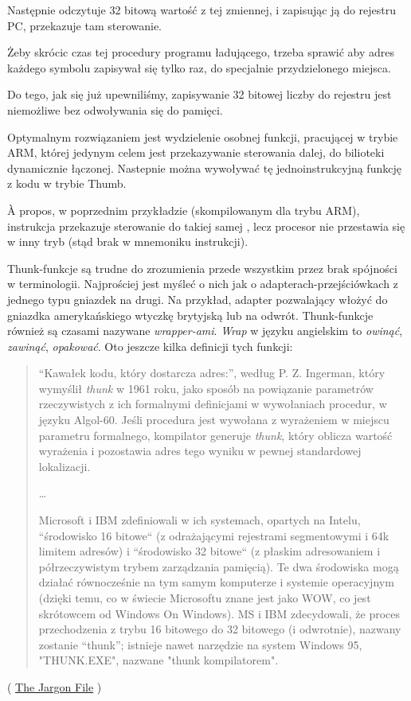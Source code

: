 Następnie  odczytuje 32 bitową wartość z tej zmiennej, i zapisując ją do rejestru \ac{PC}, przekazuje tam sterowanie.

Żeby skrócic czas tej procedury programu ładującego, trzeba sprawić aby adres każdego symbolu zapisywał się tylko raz, do specjalnie przydzielonego miejsca.

Do tego, jak się już upewniliśmy, zapisywanie 32 bitowej liczby do rejestru jest niemożliwe bez odwoływania się do pamięci.

Optymalnym rozwiązaniem jest wydzielenie osobnej funkcji, pracującej w trybie ARM,
której jedynym celem jest przekazywanie sterowania dalej, do bilioteki dynamicznie łączonej. Nastepnie można wywoływać tę jednoinstrukcyjną funkcję z kodu w trybie Thumb.

À propos, w poprzednim przykładzie (skompilowanym dla trybu ARM), instrukcja  przekazuje sterowanie do takiej samej , lecz procesor nie przestawia się w inny tryb (stąd brak  w mnemoniku instrukcji).


Thunk-funkcje są trudne do zrozumienia przede wszystkim przez brak spójności w terminologii.
Najprościej jest myśleć o nich jak o adapterach-przejściówkach z jednego typu gniazdek na drugi.
Na przykład, adapter pozwalający włożyć do gniazdka amerykańskiego wtyczkę brytyjską lub na odwrót. Thunk-funkcje również są czasami nazywane \emph{wrapper-ami}. \emph{Wrap} w języku angielskim to \emph{owinąć}, \emph{zawinąć}, \emph{opakować}.
Oto jeszcze kilka definicji tych funkcji:

\begin{framed}
\begin{quotation}
“Kawałek kodu, który dostarcza adres:”, według P. Z. Ingerman,
który wymyślił \emph{thunk} w 1961 roku, jako sposób na powiązanie parametrów rzeczywistych z ich formalnymi
definicjami w wywołaniach procedur, w języku Algol-60. Jeśli procedura jest wywołana z wyrażeniem
w miejscu parametru formalnego, kompilator generuje \emph{thunk}, który oblicza
wartość wyrażenia i pozostawia adres tego wyniku w pewnej standardowej lokalizacji.

\dots

Microsoft i IBM zdefiniowali w ich systemach, opartych na Intelu, “środowisko 16 bitowe“
(z odrażającymi rejestrami segmentowymi i 64k limitem adresów) i “środowisko 32 bitowe“
(z płaskim adresowaniem i półrzeczywistym trybem zarządzania pamięcią). Te dwa środowiska mogą
działać równocześnie na tym samym komputerze i systemie operacyjnym (dzięki temu, co w świecie Microsoftu znane jest jako WOW, co jest skrótowcem od Windows On Windows). MS i IBM zdecydowali, że proces przechodzenia
z trybu 16 bitowego do 32 bitowego (i odwrotnie), nazwany zostanie “thunk”; istnieje nawet
narzędzie na system Windows 95, "THUNK.EXE", nazwane "thunk kompilatorem".
\end{quotation}
\end{framed}
( \href{http://go.yurichev.com/17362}{The Jargon File} )

